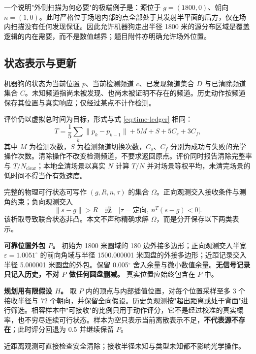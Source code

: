 一个说明"外侧扫描为何必要"的极端例子是：源位于 $g=(1800,0)$、朝向 $n=(1,0)$。此时严格位于场地内部的点全部处于其发射半平面的后方，仅在场内扫描没有任何发现保证。因此允许机器狗走出半径 1800 米的源分布区域是覆盖逻辑的内在需要，而不是数值越界；题目附件亦明确允许场外位置。

\subsection{状态表示与更新}

机器狗的状态为当前位置 $p$、当前检测频道 $c$、已发现频道集合 $D$ 与已清除频道集合 $C$。未知频道指尚未被发现、也尚未被证明不存在的频道。历史动作按频道保存其位置与真实响应；仅经过某点不计作检测。

评价仍以虚拟总时间为目标，形式与式 \eqref{eq:time-ledger} 相同：
\begin{equation}
  T=\frac15\sum_k\lVert p_k-p_{k-1}\rVert+5M+S+5C_s+3C_f ,
  \label{eq:q4-time}
\end{equation}
其中 $M$ 为检测次数，$S$ 为检测频道切换次数，$C_s$、$C_f$ 分别为成功与失败的光学操作次数。清除操作不改变检测频道，不要求返回原点。评价同时报告清除完整率与 $T/N_{\text{clear}}$；本地全清场景以真实 $N$ 计算 $T/N$ 并对场景等权平均，未清完场景的低时间不得当作有效速度。

完整的物理可行状态可写作 $(g,R,n,\tau)$ 的集合 $\Omega$。正向观测交入接收条件与测角约束；负向观测交入
\begin{equation}
  \lVert s-g\rVert>R
  \quad\text{或}\quad
  \bigl[\tau=\text{定向},\ n^{T}(s-g)<0\bigr].
  \label{eq:neg-obs}
\end{equation}
该析取导致联合状态非凸。本文不声称精确求解 $\Omega$，而是分开保存以下两类表示。

\textbf{可靠位置外包 $P$。} 初始为 1800 米圆域的 180 边外接多边形；正向观测交入半宽 $\varepsilon=1.0051^\circ$ 的前向角域与半径 1500.000001 米圆盘的外接多边形；近距记录交入半径 5.000001 米圆盘的外包。保留 0.005$^\circ$ 舍入余量与微小数值余量。\textbf{无信号记录只记入历史，不对 $P$ 做任何圆盘删减。} 真实位置应始终包含在 $P$ 中。

\textbf{规划用有限假设 $H$。} 取 $P$ 内的顶点与内部插值位置，对每个位置采样至多 3 个接收半径与 72 个朝向，并保留全向假设。历史负观测按"超出距离或处于背面"进行筛选。相容样本中"可接收"的比例只用于动作评分，它不是经过校准的真实概率，也不穷尽连续可行状态。样本为空只表示当前离散表示不足，\textbf{不代表源不存在}；此时评分回退为 0.5 并继续保留 $P$。

近距离观测可直接检查安全清除；接收半径未知与类型未知都不影响光学操作。

